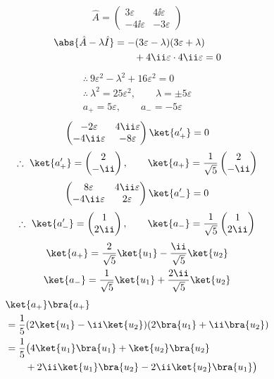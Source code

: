 \[ \hat{A}=\begin{pmatrix}3\varepsilon&4\ii\varepsilon\\-4\ii\varepsilon&-3\varepsilon\end{pmatrix} \]
\begin{align*}
\abs{\hat{A}-\lambda\hat{I}}&=-(3\varepsilon-\lambda)(3\varepsilon+\lambda)\\
&\qquad+4\ii\varepsilon\cdot4\ii\varepsilon=0
\end{align*}
\begin{gather*}
\therefore\ 9\varepsilon^{2}-\lambda^{2}+16\varepsilon^{2}=0\\
\therefore\ \lambda^{2}=25\varepsilon^{2},\qquad \lambda=\pm5\varepsilon\\
a_{+}=5\varepsilon,\qquad a_{-}=-5\varepsilon
\end{gather*}
\[ \begin{pmatrix}-2\varepsilon&4\ii\varepsilon\\-4\ii\varepsilon&-8\varepsilon\end{pmatrix}\ket{a_{+}'}=0 \]
\[ \therefore\ \ket{a_{+}'}=\begin{pmatrix}2\\-\ii\end{pmatrix},\qquad \ket{a_{+}}=\frac{1}{\sqrt{5}}\begin{pmatrix}2\\-\ii\end{pmatrix} \]
\[ \begin{pmatrix}8\varepsilon&4\ii\varepsilon\\-4\ii\varepsilon&2\varepsilon\end{pmatrix}\ket{a_{-}'}=0 \]
\[ \therefore\ \ket{a_{-}'}=\begin{pmatrix}1\\2\ii\end{pmatrix},\qquad \ket{a_{-}}=\frac{1}{\sqrt{5}}\begin{pmatrix}1\\2\ii\end{pmatrix} \]
\begin{gather*}
\ket{a_{+}}=\frac{2}{\sqrt{5}}\ket{u_{1}}-\frac{\ii}{\sqrt{5}}\ket{u_{2}}\\
\ket{a_{-}}=\frac{1}{\sqrt{5}}\ket{u_{1}}+\frac{2\ii}{\sqrt{5}}\ket{u_{2}}
\end{gather*}
\begin{align*}
&\ket{a_{+}}\bra{a_{+}}\\
&=\frac{1}{5}(2\ket{u_{1}}-\ii\ket{u_{2}})(2\bra{u_{1}}+\ii\bra{u_{2}})\\
&=\frac{1}{5}\bigl(4\ket{u_{1}}\bra{u_{1}}+\ket{u_{2}}\bra{u_{2}}\\
&\qquad+2\ii\ket{u_{1}}\bra{u_{2}}-2\ii\ket{u_{2}}\bra{u_{1}}\bigr)
\end{align*}

